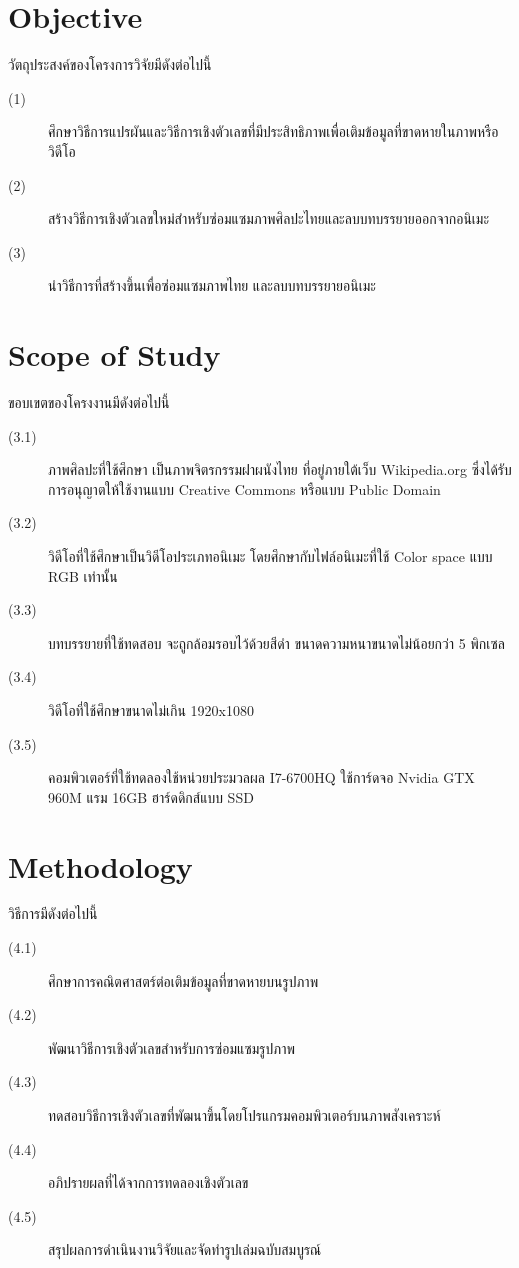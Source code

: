 \documentclass[hidelinks,a4paper,14pt]{article}
\numberwithin{equation}{section}							%
\begin{document}
{		%
\section{Objective}
วัตถุประสงค์ของโครงการวิจัยมีดังต่อไปนี้
\begin{description}
	\item[(1)]	 ศึกษาวิธีการแปรผันและวิธีการเชิงตัวเลขที่มีประสิทธิภาพเพื่อเติมข้อมูลที่ขาดหายในภาพหรือวิดีโอ
	\item[(2)] สร้างวิธีการเชิงตัวเลขใหม่สำหรับซ่อมแซมภาพศิลปะไทยและลบบทบรรยายออกจากอนิเมะ
	\item[(3)] นำวิธีการที่สร้างขึ้นเพื่อซ่อมแซมภาพไทย และลบบทบรรยายอนิเมะ	 
\end{description}

\section{Scope of Study}
ขอบเขตของโครงงานมีดังต่อไปนี้
\begin{description}
\item[(3.1)] ภาพศิลปะที่ใช้ศึกษา เป็นภาพจิตรกรรมฝาผนังไทย ที่อยู่ภายใต้เว็บ Wikipedia.org ซึ่งได้รับการอนุญาตให้ใช้งานแบบ Creative Commons หรือแบบ Public Domain
\item[(3.2)] วิดีโอที่ใช้ศึกษาเป็นวิดีโอประเภทอนิเมะ โดยศึกษากับไฟล์อนิเมะที่ใช้ Color space แบบ RGB เท่านั้น
\item[(3.3)] บทบรรยายที่ใช้ทดสอบ จะถูกล้อมรอบไว้ด้วยสีดำ ขนาดความหนาขนาดไม่น้อยกว่า 5 พิกเซล
\item[(3.4)] วิดีโอที่ใช้ศึกษาขนาดไม่เกิน 1920x1080
\item[(3.5)] คอมพิวเตอร์ที่ใช้ทดลองใช้หน่วยประมวลผล I7-6700HQ ใช้การ์ดจอ Nvidia GTX 960M แรม 16GB ฮาร์ดดิกส์แบบ SSD
\end{description}

\section{Methodology}
วิธีการมีดังต่อไปนี้
\begin{description}
	\item[(4.1)] ศึกษาการคณิตศาสตร์ต่อเติมข้อมูลที่ขาดหายบนรูปภาพ
	\item[(4.2)] พัฒนาวิธีการเชิงตัวเลขสำหรับการซ่อมแซมรูปภาพ
	\item[(4.3)] ทดสอบวิธีการเชิงตัวเลขที่พัฒนาขึ้นโดยโปรแกรมคอมพิวเตอร์บนภาพสังเคราะห์
	\item[(4.4)] อภิปรายผลที่ได้จากการทดลองเชิงตัวเลข
	\item[(4.5)] สรุปผลการดำเนินงานวิจัยและจัดทำรูปเล่มฉบับสมบูรณ์
\end{description}
}
\end{document}
